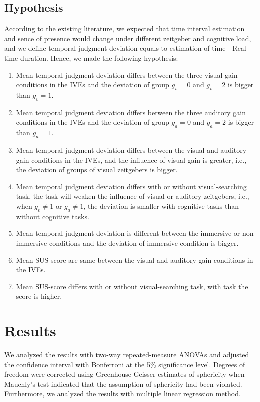 \documentclass[sigconf]{acmart}
\begin{document}
\subsection*{Hypothesis}

According to the existing literature, we expected that time interval estimation and sence of presence would change under different zeitgeber and cognitive load, and we define temporal judgment deviation equals to estimation of time - Real time duration. Hence, we made the following hypothesis:

\begin{enumerate}[H 1]
\item Mean temporal judgment deviation differs between the three visual gain conditions in the IVEs and the deviation of group $g_v = 0$ and $g_v = 2$ is bigger than $g_v = 1$.
\item Mean temporal judgment deviation differs between the three auditory gain conditions in the IVEs and the deviation of group $g_a = 0$ and $g_a = 2$ is bigger than $g_a = 1$.
\item Mean temporal judgment deviation differs between the visual and auditory gain conditions in the IVEs, and the influence of visual gain is greater, i.e., the deviation of groups of visual zeitgebers is bigger.
\item Mean temporal judgment deviation differs with or without visual-searching task, the task will weaken the influence of visual or auditory zeitgebers, i.e., when $g_v \neq 1$ or $g_a \neq 1$, the deviation is smaller with cognitive tasks than without cognitive tasks.
\item Mean temporal judgment deviation is different between the immersive or non-immersive conditions and the deviation of immersive condition is bigger.
\item Mean SUS-score are same between the visual and auditory gain conditions in the IVEs.
\item Mean SUS-score differs with or without visual-searching task, with task the score is higher.

\end{enumerate}

\section{Results}

We analyzed the results with two-way repeated-measure ANOVAs and adjusted the confidence interval with Bonferroni at the 5\% significance level. Degrees of freedom were corrected using Greenhouse-Geisser estimates of sphericity when Mauchly's test indicated that the assumption of sphericity had been violated. Furthermore, we analyzed the results with multiple linear regression method.
\end{document}
